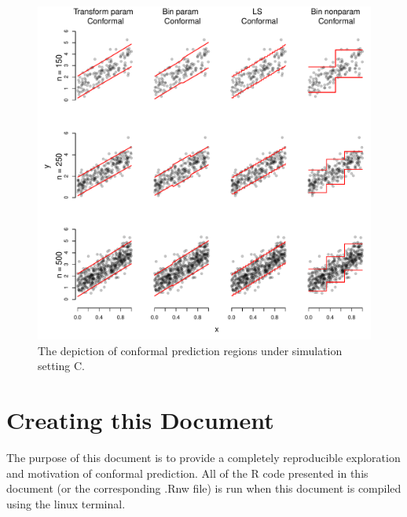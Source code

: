 \documentclass[11pt]{article}\usepackage[]{graphicx}\usepackage[]{color}
\makeatletter
\def\maxwidth{ %
  \ifdim\Gin@nat@width>\linewidth
    \linewidth
  \else
    \Gin@nat@width
  \fi
}
\newenvironment{knitrout}{}{} %
\makeatother
\begin{document}
\begin{figure}[h!]
\begin{center}
\begin{knitrout}
\color{fgcolor}
\includegraphics[width=\maxwidth]{figure/conformal-plots-C-1} 

\end{knitrout}
\end{center}
\caption{The depiction of conformal prediction regions under simulation 
  setting C.
}
\label{conformal-plots-C}
\end{figure}




\section{Creating this Document}
The purpose of this document is to provide a completely reproducible 
exploration and motivation of conformal prediction. All of the R code 
presented in this document (or the corresponding .Rnw file) is run when 
this document is compiled using the linux terminal.
\end{document}
